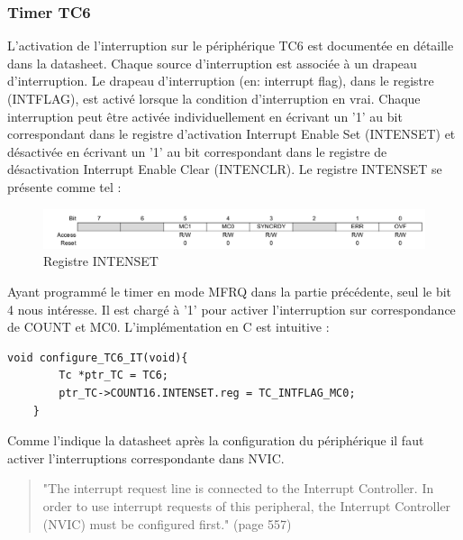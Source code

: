 \documentclass[a4paper]{article}
\begin{document}
	\subsubsection{Timer TC6}
	L'activation de l'interruption sur le périphérique TC6 est documentée en détaille dans la datasheet. \cite{data} Chaque source d'interruption est associée à un drapeau d'interruption. Le drapeau d'interruption (en: interrupt flag), dans le registre (INTFLAG), est activé lorsque la condition d'interruption en vrai. Chaque interruption peut être activée individuellement en écrivant un '1' au bit correspondant dans le registre d'activation Interrupt Enable Set (INTENSET) et désactivée en écrivant un '1' au bit correspondant dans le registre de désactivation Interrupt Enable Clear (INTENCLR).	Le registre INTENSET se présente comme tel :
	\begin{figure}[H]
		\centering
		\includegraphics[width=\linewidth]{reg_intenset}
		\caption{Registre INTENSET}
		\label{fig:INTENSET}
	\end{figure}
	Ayant programmé le timer en mode MFRQ dans la partie précédente, seul le bit 4 nous intéresse. Il est chargé à '1' pour activer l'interruption sur correspondance de COUNT et MC0. L'implémentation en C est intuitive :
	\begin{lstlisting}[style=CStyle]
	void configure_TC6_IT(void){
		Tc *ptr_TC = TC6;
		ptr_TC->COUNT16.INTENSET.reg = TC_INTFLAG_MC0;
	}
	\end{lstlisting}
	
	Comme l'indique la datasheet après la configuration du périphérique il faut activer l'interruptions correspondante dans NVIC.
	\begin{quotation}
		"The interrupt request line is connected to the Interrupt Controller. In order to use interrupt requests of this peripheral,
	the Interrupt Controller (NVIC) must be configured first." \cite{data}(page 557)
	\end{quotation}
	
\end{document}
